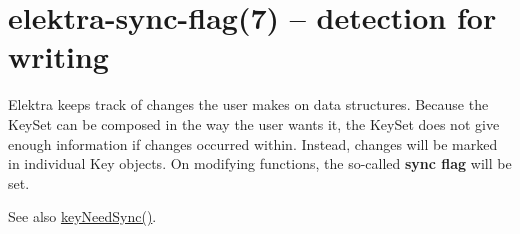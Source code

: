 \section*{elektra-\/sync-\/flag(7) -- detection for writing }

Elektra keeps track of changes the user makes on data structures. Because the {\ttfamily Key\+Set} can be composed in the way the user wants it, the {\ttfamily Key\+Set} does not give enough information if changes occurred within. Instead, changes will be marked in individual {\ttfamily Key} objects. On modifying functions, the so-\/called {\bfseries sync flag} will be set.

See also {\ttfamily \hyperlink{group__keytest_gaf247df0de7aca04b32ef80e39ef12950}{key\+Need\+Sync()}}. 